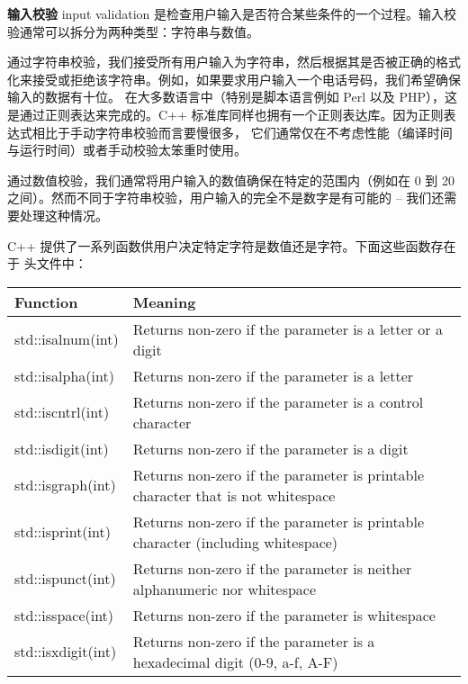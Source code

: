 \documentclass[../../LearnCpp.tex]{subfiles}
\begin{document}
\textbf{输入校验} input validation 是检查用户输入是否符合某些条件的一个过程。输入校验通常可以拆分为两种类型：字符串与数值。

通过字符串校验，我们接受所有用户输入为字符串，然后根据其是否被正确的格式化来接受或拒绝该字符串。例如，如果要求用户输入一个电话号码，我们希望确保输入的数据有十位。
在大多数语言中（特别是脚本语言例如 Perl 以及 PHP），这是通过正则表达来完成的。C++ 标准库同样也拥有一个正则表达库。因为正则表达式相比于手动字符串校验而言要慢很多，
它们通常仅在不考虑性能（编译时间与运行时间）或者手动校验太笨重时使用。

通过数值校验，我们通常将用户输入的数值确保在特定的范围内（例如在 0 到 20 之间）。然而不同于字符串校验，用户输入的完全不是数字是有可能的 -- 我们还需要处理这种情况。

C++ 提供了一系列函数供用户决定特定字符是数值还是字符。下面这些函数存在于  头文件中：

\begin{center}
  \begin{tiny}
    \begin{tabularx}{ 1\textwidth}{
        | >{\raggedright\arraybackslash}X
        | >{\raggedright\arraybackslash}X |
      }
      \hline
      Function           & Meaning                                                                         \\
      \hline
      std::isalnum(int)  & Returns non-zero if the parameter is a letter or a digit                        \\
      std::isalpha(int)  & Returns non-zero if the parameter is a letter                                   \\
      std::iscntrl(int)  & Returns non-zero if the parameter is a control character                        \\
      std::isdigit(int)  & Returns non-zero if the parameter is a digit                                    \\
      std::isgraph(int)  & Returns non-zero if the parameter is printable character that is not whitespace \\
      std::isprint(int)  & Returns non-zero if the parameter is printable character (including whitespace) \\
      std::ispunct(int)  & Returns non-zero if the parameter is neither alphanumeric nor whitespace        \\
      std::isspace(int)  & Returns non-zero if the parameter is whitespace                                 \\
      std::isxdigit(int) & Returns non-zero if the parameter is a hexadecimal digit (0-9, a-f, A-F)        \\
      \hline
    \end{tabularx}
  \end{tiny}
\end{center}
\end{document}
